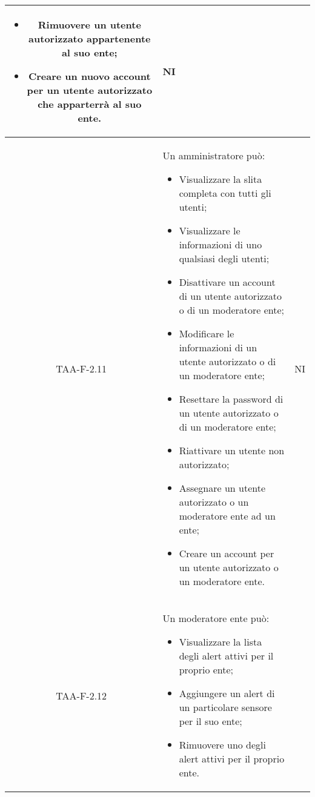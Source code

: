 \begin{center}
\begin{longtable}{|c|p{10cm}|c|}
\begin{itemize}
			 	\item Rimuovere un utente autorizzato appartenente al suo ente;
			 	\item Creare un nuovo account per un utente autorizzato che apparterrà al suo ente.
			 \end{itemize} & NI \\
			 \hline
			 TAA-F-2.11 & Un amministratore può: 
			 \begin{itemize}
			 	\item Visualizzare la slita completa con tutti gli utenti;
			 	\item Visualizzare le informazioni di uno qualsiasi degli utenti;
			 	\item Disattivare un account di un utente autorizzato o di un moderatore ente;
			 	\item Modificare le informazioni di un utente autorizzato o di un moderatore ente;
			 	\item Resettare la password di un utente autorizzato o di un moderatore ente;
			 	\item Riattivare un utente non autorizzato;
			 	\item Assegnare un utente autorizzato o un moderatore ente ad un ente;
			 	\item Creare un account per un utente autorizzato o un moderatore ente.  
			 \end{itemize} & NI \\
			 \hline
			 TAA-F-2.12 & Un moderatore ente può: 
			 \begin{itemize}
			 	\item Visualizzare la lista degli alert attivi per il proprio ente;
			 	\item Aggiungere un alert di un particolare sensore per il suo ente;
			 	\item Rimuovere uno degli alert attivi per il proprio ente.


\end{itemize}
\end{longtable}
\end{center}
